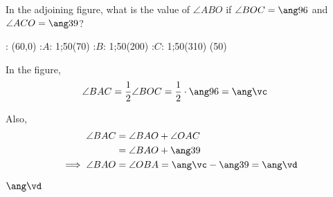 


\DIVIDE{}\vc
\SUBTRACT\vc\vb\vd

\question[2]  In the adjoining figure, what is the value of $\angle ABO$ if
$\angle BOC = \ang\va$ and $\angle ACO = \ang\vb$?

\watchout

  : (60,0)
  :$A$: 1;50(70)
  :$B$: 1;50(200)
  :$C$: 1;50(310)
\figdrawbegin{}
  (50)
  \figdrawline [2,3,1,4,2]
  \ifprintanswers
    \figdrawline [1,2]
  \fi
\figdrawend
{}

\ifprintanswers
  \begin{marginfigure}
    \centerline{\box\figBoxA}
  \end{marginfigure}
\else
  \vspace{1cm}
  \centerline{\box\figBoxA}
\fi 

\begin{solution}[\halfpage]
	In the figure, 
	\begin{align}
 		\angle BAC &= \dfrac{1}{2}\angle BOC = \dfrac{1}{2}\cdot\ang\va = \ang\vc
	\end{align}
	
	Also, 
	\begin{align}
		\angle BAC &= \angle BAO + \angle OAC \\
		           &= \angle BAO + \ang\vb \\
		\implies \angle BAO &= \angle OBA = \ang\vc - \ang\vb = \ang\vd
	\end{align}
\end{solution}
\ifprintanswers\begin{codex}$\ang\vd$\end{codex}\fi
